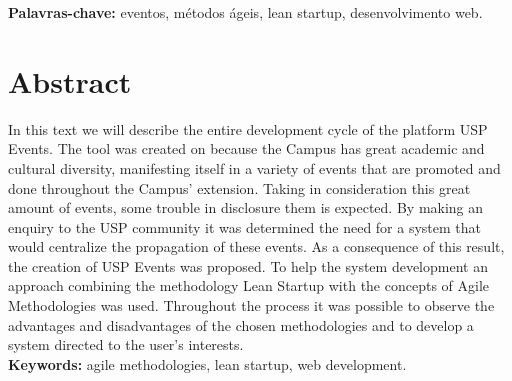 \documentclass[12pt,twoside,a4paper]{book}
\begin{document}
\noindent \textbf{Palavras-chave:} eventos, métodos ágeis, lean startup, desenvolvimento web.

\chapter*{Abstract}

\par In this text we will describe the entire development cycle of the platform USP Events. The tool was created on because the Campus has great academic and cultural diversity, manifesting itself in a variety of events that are promoted and done throughout the Campus’ extension. Taking in consideration this great amount of events, some trouble in disclosure them is expected. By making an enquiry to the USP community it was determined the need for a system that would centralize the propagation of these events. As a consequence of this result, the creation of USP Events was proposed. To help the system development an approach combining the methodology Lean Startup with the concepts of Agile Methodologies was used. Throughout the process it was possible to observe the advantages and disadvantages of the chosen methodologies and to develop a system directed to the user’s interests.
\\

\noindent \textbf{Keywords:} agile methodologies, lean startup, web development.

\tableofcontents    %


\end{document}
